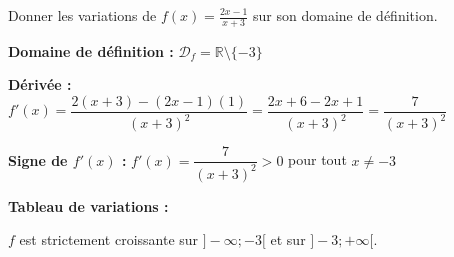 \documentclass[1,DS,p,e,prof]{phBook}
\begin{document}
\begin{exercice}
    \begin{enonce}
        Donner les variations de $f(x)=\frac{2x-1}{x+3}$ sur son domaine de définition.
    \end{enonce}
    \begin{correction} %
        \textbf{Domaine de définition :} $\mathcal{D}_f = \mathbb{R}\setminus\{-3\}$
        
        \textbf{Dérivée :} $f'(x)=\dfrac{2(x+3)-(2x-1)(1)}{(x+3)^2}=\dfrac{2x+6-2x+1}{(x+3)^2}=\dfrac{7}{(x+3)^2}$
        
        \textbf{Signe de $f'(x)$ :} $f'(x)=\dfrac{7}{(x+3)^2}>0$ pour tout $x \neq -3$
        
        \textbf{Tableau de variations :}
        \begin{center}
        \end{center}
        
        $f$ est strictement croissante sur $]-\infty;-3[$ et sur $]-3;+\infty[$.
    \end{correction}
\end{exercice}
\end{document}
